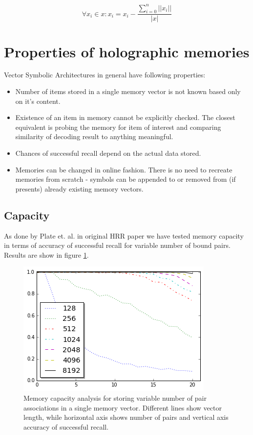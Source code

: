 \documentclass[conference]{IEEEtran}
\begin{document}
	\[ \forall x_i \in x: x_i = x_i - \frac{\sum_{i=0}^n ||x_i||}{|x|} \]
	
	\section{Properties of holographic memories}
	
	Vector Symbolic Architectures in general have following properties:
	\begin{itemize}
		\item Number of items stored in a single memory vector is not known based only on it's content.
		\item Existence of an item in memory cannot be explicitly checked. The closest equivalent is probing the memory for item of interest and comparing similarity of decoding result to anything meaningful.
		\item Chances of successful recall depend on the actual data stored.
		\item Memories can be changed in online fashion. There is no need to recreate memories from scratch - symbols can be appended to or removed from (if presents) already existing memory vectors.
	\end{itemize}
	
	\subsection{Capacity}
	
	As done by Plate et. al. in original HRR paper \cite{Plate:1995:HolographicReducedRepresentations} we have tested memory capacity in terms of accuracy of successful recall for variable number of bound pairs. Results are show in figure \ref{fig:capacity}.
	
		\begin{figure}[th!]
			\center
			\includegraphics[width=0.8\columnwidth]{img/capacity.png}
			\caption{Memory capacity analysis for storing variable number of pair associations in a single memory vector. Different lines show vector length, while horizontal axis shows number of pairs and vertical axis accuracy of successful recall.}
			\label{fig:capacity}
		\end{figure}
	
\end{document}
